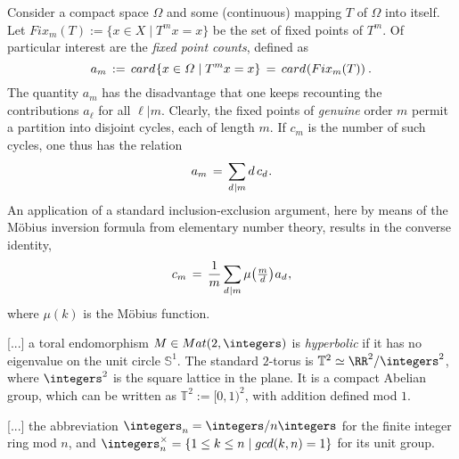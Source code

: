 {Consider a compact space $\varOmega$ and some (continuous) mapping $T$
of $\varOmega$ into itself. Let ${Fix}_m (T) := \{ x\in X \mid T^m x =
x\}$ be the set of fixed points of $T^m$.  Of particular interest are
the \emph{fixed point counts}, defined as
\begin{equation} \label{def-a}
     a_m \, := \, {card{\hspace{0.5pt}}} \{x\in \varOmega \mid T^m x=x\}
     \, = \,  {card{\hspace{0.5pt}}} ({Fix}_m (T)){\hspace{0.5pt}}
\,.
\end{equation}
The quantity $a_m$ has the disadvantage that one keeps recounting the
contributions $a^{}_{\ell}$ for all $\ell | m$. Clearly, the fixed
points of \emph{genuine} order $m$ permit a partition into disjoint
cycles, each of length $m$. If $c_m$ is the number of such cycles, one
thus has the relation
\begin{equation} \label{a-from-c}
   a_m \, = \, \sum_{d{\hspace{0.5pt}} | m} d\, c_d {\hspace{0.5pt}} .
\end{equation}
An application of a standard inclusion-exclusion argument, here
by means of the M\"obius inversion formula from elementary
number theory, results in the converse identity,
\begin{equation} \label{c-from-a}
    c_m \, = \, \frac{1}{m} \sum_{d{\hspace{0.5pt}} |  m}
   \mu \big( \tfrac{m}{d}\big) {\hspace{0.5pt}}  a_d{\hspace{0.5pt}} ,
\end{equation}
where $\mu(k)$ is the M\"obius function.

[...] a toral endomorphism $M\in {Mat}(2,\integers)$ is
\emph{hyperbolic} if it has no eigenvalue on the unit circle
$\mathbb{S}^1$. The standard $2$-torus is $\mathbb{T}^2 \simeq \RR^2/
\integers^2$, where $\integers^2$ is the square lattice in the plane. It is a
compact Abelian group, which can be written as $\mathbb{T}^2 := [0,1)^2$,
with addition defined mod $1$.

[...] the abbreviation $\integers_n = \integers/n\integers$ for the
finite integer ring mod $n$, and $\integers_n^{\times}=\{1\le k\le n \mid
gcd (k,n) = 1\}$ for its unit group.

}
